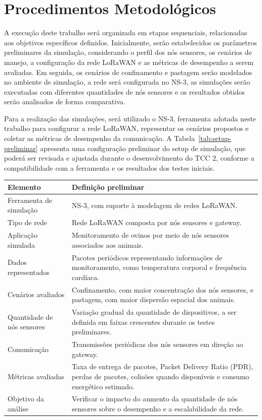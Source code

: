 \section{Procedimentos Metodológicos}
\label{sec:procedimentos-metodologicos}

A execução deste trabalho será organizada em etapas sequenciais, relacionadas aos objetivos específicos definidos. Inicialmente, serão estabelecidos os parâmetros preliminares da simulação, considerando o perfil dos nós sensores, os cenários de manejo, a configuração da rede LoRaWAN e as métricas de desempenho a serem avaliadas. Em seguida, os cenários de confinamento e pastagem serão modelados no ambiente de simulação, a rede será configurada no NS-3, as simulações serão executadas com diferentes quantidades de nós sensores e os resultados obtidos serão analisados de forma comparativa.

Para a realização das simulações, será utilizado o NS-3, ferramenta adotada neste trabalho para configurar a rede LoRaWAN, representar os cenários propostos e coletar as métricas de desempenho da comunicação. A Tabela~\ref{tab:setup-preliminar} apresenta uma configuração preliminar do setup de simulação, que poderá ser revisada e ajustada durante o desenvolvimento do TCC 2, conforme a compatibilidade com a ferramenta e os resultados dos testes iniciais.

\begin{table}[h!]
\centering
\captionsetup{width=16cm}
\begin{tabular}{p{4.5cm} p{10.5cm}}
\hline
\textbf{Elemento} & \textbf{Definição preliminar} \\
\hline
Ferramenta de simulação & NS-3, com suporte à modelagem de redes LoRaWAN. \\
Tipo de rede & Rede LoRaWAN composta por nós sensores e gateway. \\
Aplicação simulada & Monitoramento de ovinos por meio de nós sensores associados aos animais. \\
Dados representados & Pacotes periódicos representando informações de monitoramento, como temperatura corporal e frequência cardíaca. \\
Cenários avaliados & Confinamento, com maior concentração dos nós sensores, e pastagem, com maior dispersão espacial dos animais. \\
Quantidade de nós sensores & Variação gradual da quantidade de dispositivos, a ser definida em faixas crescentes durante os testes preliminares. \\
Comunicação & Transmissões periódicas dos nós sensores em direção ao gateway. \\
Métricas avaliadas & Taxa de entrega de pacotes, Packet Delivery Ratio (PDR), perdas de pacotes, colisões quando disponíveis e consumo energético estimado. \\
Objetivo da análise & Verificar o impacto do aumento da quantidade de nós sensores sobre o desempenho e a escalabilidade da rede. \\
\hline
\end{tabular}
\end{table}

